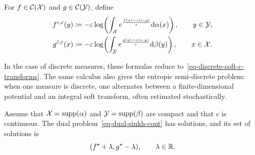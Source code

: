 \begin{defn}\label{def-continuous-soft-c-transform}
	For $f\in\mathcal{C}(\mathcal{X})$ and $g\in\mathcal{C}(\mathcal{Y})$, define
	\begin{align}
		f^{c,\varepsilon}(y)
		&\coloneqq
		-\varepsilon\log\!\left(
			\int_{\mathcal{X}}
			e^{\frac{f(x)-c(x,y)}{\varepsilon}}\mathrm{d}\alpha(x)
		\right),
		\qquad y\in\mathcal{Y}, \label{eq-soft-c-cont-f}\\
		g^{\bar c,\varepsilon}(x)
		&\coloneqq
		-\varepsilon\log\!\left(
			\int_{\mathcal{Y}}
			e^{\frac{g(y)-c(x,y)}{\varepsilon}}\mathrm{d}\beta(y)
		\right),
		\qquad x\in\mathcal{X}. \label{eq-soft-c-cont-g}
	\end{align}
\end{defn}
In the case of discrete measures, these formulas reduce to~\eqref{eq-discrete-soft-c-transforms}. The same calculus also gives the entropic semi-discrete problem: when one measure is discrete, one alternates between a finite-dimensional potential and an integral soft transform, often estimated stochastically.

\begin{prop}\label{prop-entropic-dual-potentials}
	Assume that $\mathcal{X}=\operatorname{supp}(\alpha)$ and $\mathcal{Y}=\operatorname{supp}(\beta)$ are compact and that $c$ is continuous. The dual problem~\eqref{eq-dual-sinkh-cont} has solutions, and its set of solutions is
	\[
		(f^\star+\lambda,g^\star-\lambda),
		\qquad \lambda\in\mathbb{R}.
	\]
\end{prop}

